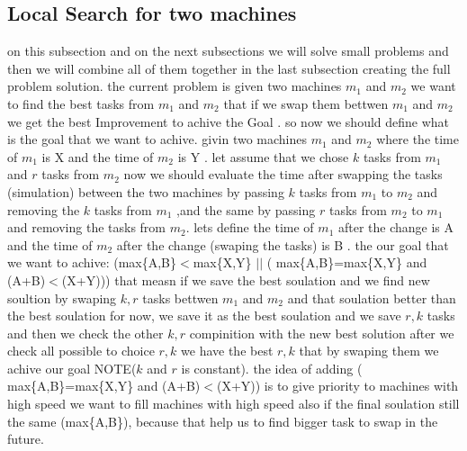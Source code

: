 \documentclass[11pt,fullpage]{article}
\begin{document}
\subsection{Local Search for two machines}
on this subsection and on the next subsections we will solve small problems and then we will combine all of them together in the last subsection creating the full problem solution. \newline
the current problem is given two machines $m_1$  and $m_2$ we want to find the best tasks from $m_1$  and $m_2$   that if we
swap them bettwen  $m_1$  and $m_2$  we get the best Improvement to achive the Goal . so now we should define what is the goal that we want to achive.\newline
givin two machines   $m_1$  and $m_2$ where the time of $m_1$ is X and the time of $m_2$ is Y . let assume that we chose $k$ tasks from $m_1$ and $r$ tasks from $m_2$  now we should evaluate the time after swapping the tasks (simulation) between the two machines by passing $k$ tasks from $m_1$ to $m_2$ and removing the $k$ tasks from $m_1$ ,and the same by passing $r$ tasks from $m_2$ to $m_1$ and removing the tasks from $m_2$. lets define the time of $m_1$ after the change is A and the time of $m_2$ after the change (swaping the tasks) is B . the our goal that we want to achive:\newline
 (max\{A,B\}$<$max\{X,Y\} $ ||$ ( max\{A,B\}=max\{X,Y\}  and (A+B)$<$(X+Y))) \newline
that measn if we save the best soulation and we find new soultion by swaping $k , r$ tasks bettwen $m_1$ and $m_2$ and that soulation  better than the best soulation for now, we save it as the best soulation and we save $r, k$ tasks and then we check the other $k, r$ compinition with the
new best solution after we check all possible to choice  $r, k$ we have the best $r,k$ that by swaping them we achive our goal NOTE($k $ and $ r$ is constant).\newline
the idea of adding ( max\{A,B\}=max\{X,Y\}  and (A+B)$<$(X+Y)) is to give priority to machines with high speed we want to fill machines with high speed also 
if the final soulation still the same (max\{A,B\}), because that help us to find bigger task to swap in the future.
\end{document}
